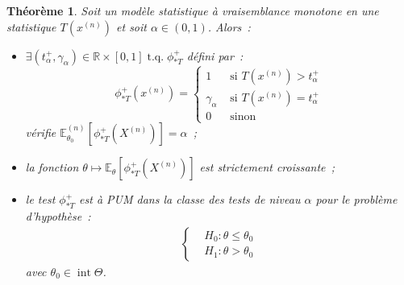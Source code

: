 \documentclass{report}
\DeclareMathOperator{\tq}{\text{ t.q. }}
\DeclareMathOperator{\intr}{int}  %
\newcommand{\E}{\mathbb E}
\newcommand{\R}{\mathbb R}
\newcommand{\n}{{(n)}}
\newcommand{\Xn}{{X^\n}}
\newtheorem{thm}{Théorème}[chapter]
\theoremstyle{definition}
\theoremstyle{remark}
\begin{document}
		\begin{thm}\label{thm:fct_puissance_strict_croissante} Soit un modèle statistique à vraisemblance monotone en une statistique $T(x^\n)$ et soit
		$\alpha \in (0, 1)$. Alors~:
		\begin{itemize}
			\item $\exists (t_\alpha^+, \gamma_\alpha) \in \R \times [0, 1] \tq \phi_{*T}^+$ défini par~:
			\[\phi_{*T}^+(x^\n) =
			\begin{cases}
				1 &\text{ si } T(x^\n) > t_\alpha^+ \\
				\gamma_\alpha &\text{ si } T(x^\n) = t_\alpha^+ \\
				0 &\text{ sinon}
			\end{cases}\]
			vérifie $\E_{\theta_0}^\n[\phi_{*T}^+(\Xn)] = \alpha$~;
			\item la fonction $\theta \mapsto \E_\theta[\phi_{*T}^+(\Xn)]$ est strictement croissante~;
			\item le test $\phi_{*T}^+$ est à PUM dans la classe des tests de niveau $\alpha$ pour le problème d'hypothèse~:
			\begin{align}\label{eq:test_hyp_leq_>}
				\begin{cases}
					&H_0 : \theta \leq \theta_0 \\
					&H_1 : \theta > \theta_0
				\end{cases}
			\end{align}
			avec $\theta_0 \in \intr \Theta$.
		\end{itemize}
		\end{thm}
\end{document}
